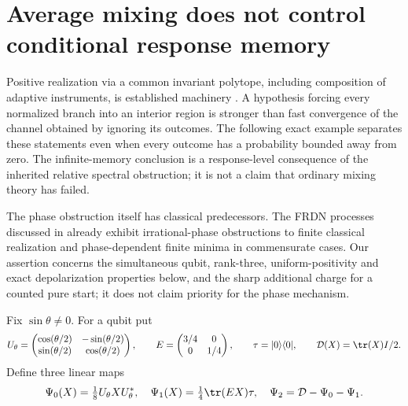 \section{Average mixing does not control conditional response memory}
\label{sec:r74-mixing-obstruction}

Positive realization via a common invariant polytope, including composition
of adaptive instruments, is established machinery
\cite{MonrasWinter14,Okay26}. A hypothesis forcing every normalized branch
into an interior region is stronger than fast convergence of the channel
obtained by ignoring its outcomes. The following exact example separates
these statements even when every outcome has a probability bounded away
from zero. The infinite-memory conclusion is a response-level consequence
of the inherited relative spectral obstruction; it is not a claim that
ordinary mixing theory has failed.

The phase obstruction itself has classical predecessors. The FRDN processes
discussed in \cite[Section 2.3]{Fanizza24} already exhibit
irrational-phase obstructions to finite classical realization and
phase-dependent finite minima in commensurate cases. Our assertion concerns
the simultaneous qubit, rank-three, uniform-positivity and exact
depolarization properties below, and the sharp additional charge for a
counted pure start; it does not claim priority for the phase mechanism.

Fix $\sin\theta\ne0$. For a qubit put
\[
 U_\theta=\begin{pmatrix}
 \cos(\theta/2)&-\sin(\theta/2)\\
 \sin(\theta/2)&\cos(\theta/2)
 \end{pmatrix},\qquad
 E=\begin{pmatrix}3/4&0\\0&1/4\end{pmatrix},\qquad
 \tau=|0\rangle\langle0|,
 \qquad \mathcal D(X)=\tr(X)I/2.
\]
Define three linear maps
\begin{equation}\label{eq:r74-depolarizing-instrument}
 \Psi_0(X)=\tfrac18U_\theta XU_\theta^*,\quad
 \Psi_1(X)=\tfrac14\tr(EX)\tau,\quad
 \Psi_2=\mathcal D-\Psi_0-\Psi_1.
\end{equation}

